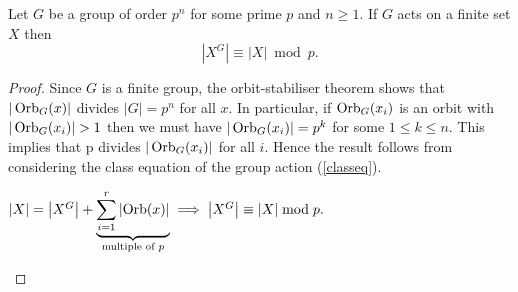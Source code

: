 \begin{lem}
    Let $G$ be a group of order $p^n$ for some prime $p$ and $n \geq 1$. If $G$ acts on a finite set $X$ then
    $$
        \left|X^G\right| \equiv|X| \bmod p. \label{usefullemma}
    $$
\end{lem}
\begin{proof}
    Since $G$ is a finite group, the orbit-stabiliser theorem shows that $|\operatorname*{Orb}_G(x)|$ divides $|G| = p^n$ for all $x$. In particular, if $\operatorname*{Orb}_G(x_i)$ is an orbit with $|\operatorname*{Orb}_G(x_i)| > 1$ then we must have $|\operatorname*{Orb}_G(x_i)| = p^k$ for some $1 \leq k \leq n$. This implies that p divides $|\operatorname*{Orb}_G(x_i)|$ for all $i$. Hence the result follows from considering the class equation of the group action (\ref{classeq}).
    \begin{center}
    $
    |X|=\left|X^G\right|+\underbrace{\sum_{i=1}^r\left|\operatorname*{Orb}(x)\right|}_{\textrm{multiple of $p$}}
    \implies \left|X^G\right| \equiv |X| \bmod p.
    $
    \end{center}
\end{proof}

